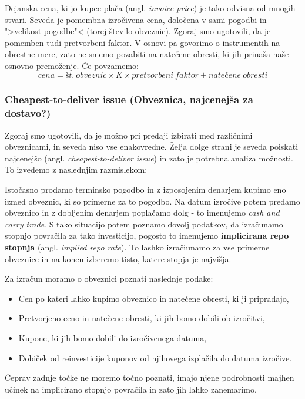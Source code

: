 \documentclass[a4paper, 12pt]{article}
\begin{document}

Dejanska cena, ki jo kupec plača (angl. \textit{invoice price}) je tako odvisna od mnogih stvari. 
Seveda je pomembna izročivena cena, določena v sami pogodbi in ">velikost pogodbe"< (torej število
obveznic). Zgoraj smo ugotovili, da je pomemben tudi pretvorbeni faktor. V osnovi pa govorimo o 
instrumentih na obrestne mere, zato ne smemo pozabiti na natečene obresti, ki jih prinaša naše 
osnovno premoženje. Če povzamemo:
%
$$ cena = št.\:obveznic \times K \times pretvorbeni\:faktor + natečene\:obresti $$
%

\subsubsection{Cheapest-to-deliver issue (Obveznica, najcenejša za dostavo?)}
Zgoraj smo ugotovili, da je možno pri predaji izbirati med različnimi obveznicami, in seveda niso
vse enakovredne. Želja dolge strani je seveda poiskati najcenejšo (angl. \textit{cheapest-to-deliver
issue}) in zato je potrebna analiza možnosti. To izvedemo z naslednjim razmislekom:

Istočasno prodamo terminsko pogodbo in z izposojenim denarjem kupimo eno izmed obveznic, ki so 
primerne za to pogodbo. Na datum izročive potem predamo obveznico in z dobljenim denarjem 
poplačamo dolg - to imenujemo \textit{cash and carry trade}. S tako situacijo potem poznamo
dovolj podatkov, da izračunamo stopnjo povračila za tako investicijo, pogosto to imenujemo
\textbf{implicirana repo stopnja} (angl. \textit{implied repo rate}). To lashko izračiunamo
za vse primerne obveznice in na koncu izberemo tisto, katere stopja je najvišja. 

Za izračun moramo o obveznici poznati naslednje podake:

\begin{itemize}
    \item Cen po kateri lahko kupimo obveznico in natečene obresti, ki ji pripradajo,
    \item Pretvorjeno ceno in natečene obresti, ki jih bomo dobili ob izročitvi, 
    \item Kupone, ki jih bomo dobili do izročivenega datuma,
    \item Dobiček od reinvesticije kuponov od njihovega izplačila do datuma izročive.
\end{itemize}

Čeprav zadnje točke ne moremo točno poznati, imajo njene podrobnosti majhen učinek na 
implicirano stopnjo povračila in zato jih lahko zanemarimo. 
\end{document}
